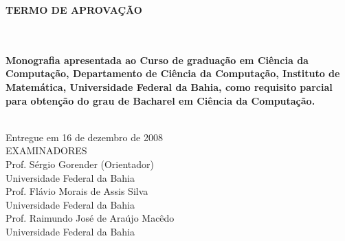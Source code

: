 

\begin{titlepage}
 \vfill
 \begin{center}
   {\large \uppercase{ \bf{ TERMO DE APROVAÇÃO } } } \\[2.5cm]
   {\large \uppercase{ \bf{ \meunome\ } } } \\[3cm]
   {\Large \uppercase{ \bf{ \meutitulo\ } } }\\[3cm]
   \hspace{.45\textwidth} %
   \begin{minipage}{.5\textwidth}
     \begin{espacosimples}
       \bf{
	Monografia apresentada ao Curso de graduação em Ciência da Computação, 
	Departamento de Ciência da Computação, Instituto de Matemática,  Universidade Federal da 
	Bahia, como requisito parcial para obtenção do grau de Bacharel em  Ciência da Computação. \\ 
       }      
     \end{espacosimples}
   \end{minipage}
   \\[0.8cm]
   Entregue em 16 de dezembro de 2008 \\[1.2cm]
   EXAMINADORES \\[1cm]
   Prof. Sérgio Gorender (Orientador) \\[-0.15cm]
   Universidade Federal da Bahia \\[0.3cm]
   Prof. Flávio Morais de Assis Silva \\[-0.15cm]
   Universidade Federal da Bahia \\[0.3cm]
   Prof. Raimundo José de Araújo Macêdo \\[-0.15cm]
   Universidade Federal da Bahia \\[0.3cm]
   \vfill
 \end{center}
\end{titlepage}
